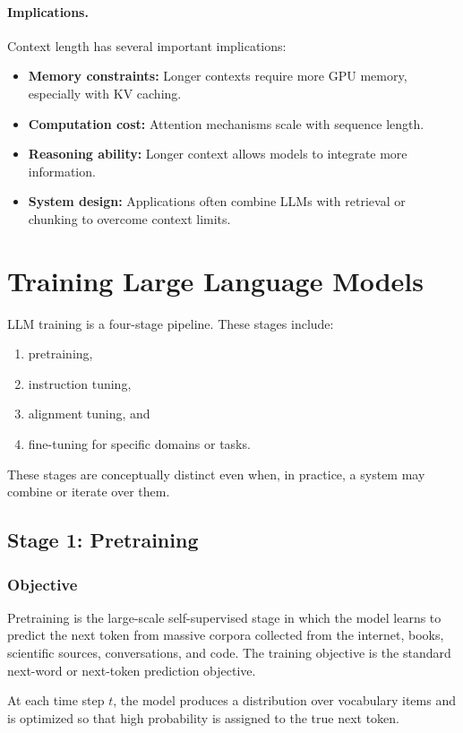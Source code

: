 \documentclass{article}
\begin{document}
\paragraph{Implications.}
Context length has several important implications:
\begin{itemize}
    \item \textbf{Memory constraints:} Longer contexts require more GPU memory, especially with KV caching.
    \item \textbf{Computation cost:} Attention mechanisms scale with sequence length.
    \item \textbf{Reasoning ability:} Longer context allows models to integrate more information.
    \item \textbf{System design:} Applications often combine LLMs with retrieval or chunking to overcome context limits.
\end{itemize}

\section{Training Large Language Models}
LLM training is a four-stage pipeline. These stages include:
\begin{enumerate}
    \item pretraining,
    \item instruction tuning,
    \item alignment tuning, and
    \item fine-tuning for specific domains or tasks.
\end{enumerate}
These stages are conceptually distinct even when, in practice, a system may combine or iterate over them.

\subsection{Stage 1: Pretraining}
\subsubsection{Objective}
Pretraining is the large-scale self-supervised stage in which the model learns to predict the next token from massive corpora collected from the internet, books, scientific sources, conversations, and code. The training objective is the standard next-word or next-token prediction objective.

At each time step $t$, the model produces a distribution over vocabulary items and is optimized so that high probability is assigned to the true next token.
\end{document}
